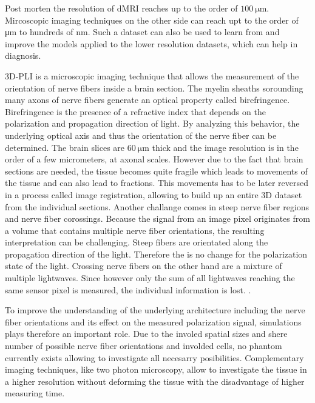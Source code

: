 Post morten the resolution of \ac{dMRI} reaches up to the order of $\SI{100}{\micro\meter}$.
Mircoscopic imaging techniques on the other side can reach upt to the order of \si{\micro\meter} to hundreds of \si{\nano\meter}.
Such a dataset can also be used to learn from and improve the models applied to the lower resolution datasets, which can help in diagnosis. \cite{MaierHein2017, Schilling2021, Yendiki2021, Costantini2021}
\par
% 
\ac{3D-PLI} is a microscopic imaging technique that allows the measurement of the orientation of nerve fibers inside a brain section.
The myelin sheaths sorounding many axons of nerve fibers generate an optical property called birefringence.
Birefringence is the presence of a refractive index that depends on the polarization and propagation direction of light.
By analyzing this behavior, the underlying optical axis and thus the orientation of the nerve fiber can be determined.
The brain slices are $\SI{60}{\micro\meter}$ thick and the image resolution is in the order of a few micrometers, \ie{} at axonal scales.
However due to the fact that brain sections are needed, the tissue becomes quite fragile which leads to movements of the tissue and can also lead to fractions.
This movements has to be later reversed in a process called image registration, allowing to build up an entire 3D dataset from the individual sections.
Another challange comes in steep nerve fiber regions and nerve fiber corossings.
Because the signal from an image pixel originates from a volume that contains multiple nerve fiber orientations, the resulting interpretation can be challenging.
Steep fibers are \eg{} orientated along the propagation direction of the light.
Therefore the is no change for the polarization state of the light.
Crossing nerve fibers on the other hand are a mixture of multiple lightwaves.
Since however only the sum of all lightwaves reaching the same sensor pixel is measured, the individual information is lost.
. \cite{Axer2011a, Axer2011, Axer2016}
\par
% 
To improve the understanding of the underlying architecture including the nerve fiber orientations and its effect on the measured polarization signal, simulations plays therefore an important role.
Due to the involed spatial sizes and shere number of possible nerve fiber orientations and involded cells, no phantom currently exists allowing to investigate all necesarry posibilities.
Complementary imaging techniques, like two photon microscopy, allow to investigate the tissue in a higher resolution without deforming the tissue with the disadvantage of higher measuring time.
